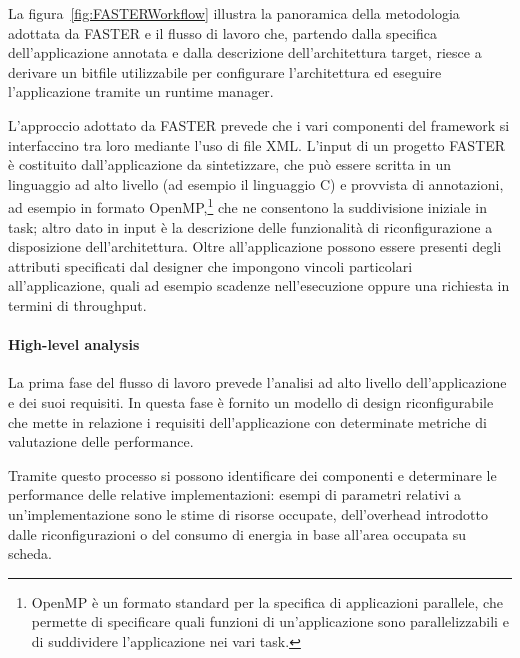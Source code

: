 La figura~\ref{fig:FASTERWorkflow} illustra la panoramica della metodologia 
adottata da \ac{FASTER} e il flusso di lavoro che, partendo dalla specifica 
dell'applicazione annotata e dalla descrizione dell'architettura target, riesce 
a derivare un bitfile utilizzabile per configurare l'architettura ed eseguire 
l'applicazione tramite un runtime manager.

L'approccio adottato da \ac{FASTER} prevede che i vari componenti del framework
si interfaccino tra loro mediante l'uso di file XML. L'input di un progetto
\ac{FASTER} è costituito dall'applicazione da sintetizzare, che può essere
scritta in un linguaggio ad alto livello (ad esempio il linguaggio C) e
provvista di annotazioni, ad esempio in formato OpenMP,\footnote{OpenMP è un
  formato standard per la specifica di applicazioni parallele, che permette di
  specificare quali funzioni di un'applicazione sono parallelizzabili e di
suddividere l'applicazione nei vari task.} che ne consentono la suddivisione
iniziale in task; altro dato in input \`e la descrizione delle funzionalità di
riconfigurazione a disposizione dell'architettura. Oltre all'applicazione
possono essere presenti degli attributi specificati dal designer che impongono
vincoli particolari all'applicazione, quali ad esempio scadenze nell'esecuzione
oppure una richiesta in termini di throughput.

\paragraph{High-level analysis}
La prima fase del flusso di lavoro prevede l'analisi ad alto livello 
dell'applicazione e dei suoi requisiti. In questa fase è fornito un modello di 
design riconfigurabile che mette in relazione i requisiti dell'applicazione con 
determinate metriche di valutazione delle performance.

Tramite questo processo si possono identificare dei componenti e determinare le 
performance delle relative implementazioni: esempi di parametri relativi a
un'implementazione sono le stime di risorse occupate, dell'overhead introdotto 
dalle riconfigurazioni o del consumo di energia in base all'area occupata su 
scheda.

